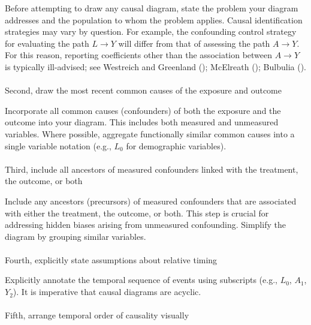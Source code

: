 \documentclass[
  singlecolumn]{article}
\makeatletter
\let\oldparagraph\paragraph
\renewcommand{\paragraph}{
    \@ifstar
      \xxxParagraphStar
      \xxxParagraphNoStar
  }
\newcommand{\xxxParagraphStar}[1]{\oldparagraph*{#1}\mbox{}}
\newcommand{\xxxParagraphNoStar}[1]{\oldparagraph{#1}\mbox{}}
\makeatother
\begin{document}
Before attempting to draw any causal diagram, state the problem your
diagram addresses and the population to whom the problem applies. Causal
identification strategies may vary by question. For example, the
confounding control strategy for evaluating the path \(L\to Y\) will
differ from that of assessing the path \(A\to Y\). For this reason,
reporting coefficients other than the association between \(A \to Y\) is
typically ill-advised; see Westreich and Greenland
(); McElreath
(); Bulbulia
().

\paragraph{Second, draw the most recent common causes of the exposure
and
outcome}\label{second-draw-the-most-recent-common-causes-of-the-exposure-and-outcome}

Incorporate all common causes (confounders) of both the exposure and the
outcome into your diagram. This includes both measured and unmeasured
variables. Where possible, aggregate functionally similar common causes
into a single variable notation (e.g., \(L_0\) for demographic
variables).

\paragraph{Third, include all ancestors of measured confounders linked
with the treatment, the outcome, or
both}\label{third-include-all-ancestors-of-measured-confounders-linked-with-the-treatment-the-outcome-or-both}

Include any ancestors (precursors) of measured confounders that are
associated with either the treatment, the outcome, or both. This step is
crucial for addressing hidden biases arising from unmeasured
confounding. Simplify the diagram by grouping similar variables.

\paragraph{Fourth, explicitly state assumptions about relative
timing}\label{fourth-explicitly-state-assumptions-about-relative-timing}

Explicitly annotate the temporal sequence of events using subscripts
(e.g., \(L_0\), \(A_1\), \(Y_2\)). It is imperative that causal diagrams
are acyclic.

\paragraph{Fifth, arrange temporal order of causality
visually}\label{fifth-arrange-temporal-order-of-causality-visually}
\end{document}
